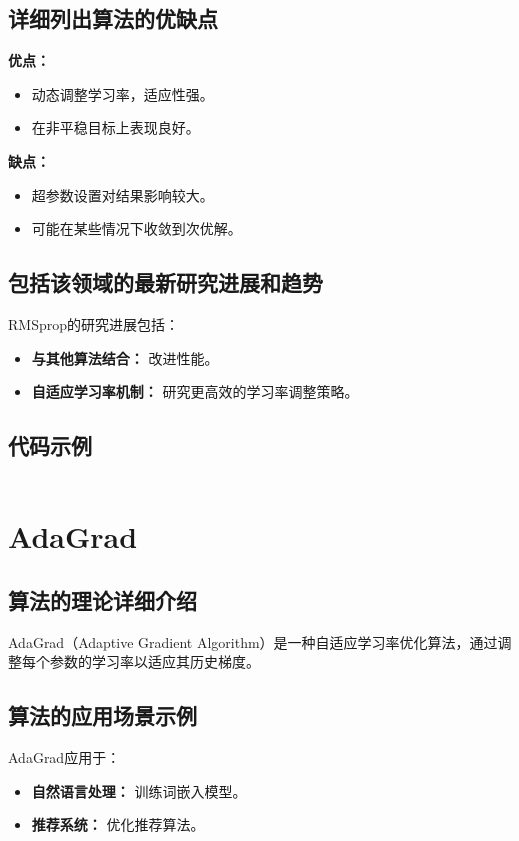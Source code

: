 \subsection*{详细列出算法的优缺点}
\textbf{优点：}
\begin{itemize}
    \item 动态调整学习率，适应性强。
    \item 在非平稳目标上表现良好。
\end{itemize}

\textbf{缺点：}
\begin{itemize}
    \item 超参数设置对结果影响较大。
    \item 可能在某些情况下收敛到次优解。
\end{itemize}

\subsection*{包括该领域的最新研究进展和趋势}
RMSprop的研究进展包括：
\begin{itemize}
    \item \textbf{与其他算法结合：} 改进性能。
    \item \textbf{自适应学习率机制：} 研究更高效的学习率调整策略。
\end{itemize}
\subsection*{代码示例}
\begin{lstlisting}

\end{lstlisting}


\section{AdaGrad}
\subsection*{算法的理论详细介绍}
AdaGrad（Adaptive Gradient Algorithm）是一种自适应学习率优化算法，通过调整每个参数的学习率以适应其历史梯度。

\subsection*{算法的应用场景示例}
AdaGrad应用于：
\begin{itemize}
    \item \textbf{自然语言处理：} 训练词嵌入模型。
    \item \textbf{推荐系统：} 优化推荐算法。
\end{itemize}

